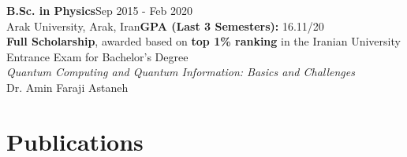 \documentclass[letter,20pt]{article}
\begin{document}
{\fontsize{9}{12}\selectfont %
\textbf{B.Sc. in Physics}\hfill {\footnotesize Sep 2015 - Feb 2020}\\\vspace{5pt}
\hspace{10pt}Arak University, Arak, Iran\hfill \hspace{10pt}\footnotesize \textbf{GPA (Last 3 Semesters):} 16.11/20\vspace{3pt}\\
\hspace{10pt}\textbf{Full Scholarship}, awarded based on \textbf{top 1\% ranking} in the Iranian University Entrance Exam for Bachelor's Degree\\
\fontsize{9}{12}\selectfont\hspace{10pt} \textit{Quantum Computing and Quantum Information: Basics and Challenges}\\
\fontsize{9}{12}\selectfont\hspace{10pt} Dr. Amin Faraji Astaneh}\\


\section{\textbf{Publications}}
\vspace{5pt}
\end{document}
